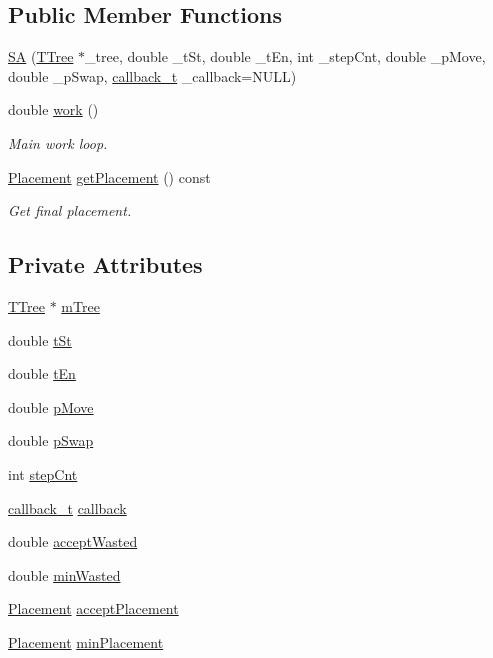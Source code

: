 \subsection*{Public Member Functions}
\begin{DoxyCompactItemize}
\item 
\hyperlink{classSA_ac1df9b4c512dd7aa1127db1237d1dc6c}{S\+A} (\hyperlink{classTTree}{T\+Tree} $\ast$\+\_\+tree, double \+\_\+t\+St, double \+\_\+t\+En, int \+\_\+step\+Cnt, double \+\_\+p\+Move, double \+\_\+p\+Swap, \hyperlink{classSA_a7aa15ea6b053d509ced8b7ae41609052}{callback\+\_\+t} \+\_\+callback=N\+U\+L\+L)
\item 
double \hyperlink{classSA_a18ee7914752d0f5add1860099a2cadf3}{work} ()
\begin{DoxyCompactList}\small\item\em Main work loop. \end{DoxyCompactList}\item 
\hyperlink{classPlacement}{Placement} \hyperlink{classSA_ae0af3686177f62dca04b108a833343ea}{get\+Placement} () const 
\begin{DoxyCompactList}\small\item\em Get final placement. \end{DoxyCompactList}\end{DoxyCompactItemize}
\subsection*{Private Attributes}
\begin{DoxyCompactItemize}
\item 
\hyperlink{classTTree}{T\+Tree} $\ast$ \hyperlink{classSA_a343f0b884e2e401a6fa21204d52ab0f6}{m\+Tree}
\item 
double \hyperlink{classSA_a5566e85c234f471529ca562d60df248e}{t\+St}
\item 
double \hyperlink{classSA_a88901560521839c476ce701963535272}{t\+En}
\item 
double \hyperlink{classSA_aba9b89c167fbcd56a06d59d05eea4d04}{p\+Move}
\item 
double \hyperlink{classSA_a056880e82a5de909aad7f135ebe9bb94}{p\+Swap}
\item 
int \hyperlink{classSA_a962a5a174cf04c8bfd062f3ab43cca78}{step\+Cnt}
\item 
\hyperlink{classSA_a7aa15ea6b053d509ced8b7ae41609052}{callback\+\_\+t} \hyperlink{classSA_a10cdd117fe4155341be9239ec2ddec16}{callback}
\item 
double \hyperlink{classSA_acf8c139fba3b7a56ac5aab959c4d735d}{accept\+Wasted}
\item 
double \hyperlink{classSA_a538b1d25b6b4c7683b3bac3212b01b3c}{min\+Wasted}
\item 
\hyperlink{classPlacement}{Placement} \hyperlink{classSA_a54c2ec1f77612474dc6aec95a788990f}{accept\+Placement}
\item 
\hyperlink{classPlacement}{Placement} \hyperlink{classSA_a7e672b166a76e7c57d036443536b7bdb}{min\+Placement}
\end{DoxyCompactItemize}


